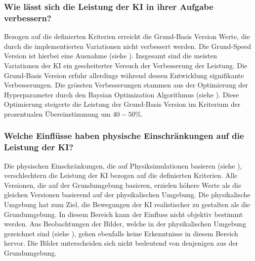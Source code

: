  
\subsubsection*{Wie lässt sich die Leistung der KI in ihrer Aufgabe verbessern?}\label{subsub:d_frage_unter_3}
Bezogen auf die definierten Kriterien erreicht die Grund-Basis Version Werte,
die durch die implementierten Variationen nicht verbessert werden. Die
Grund-Speed Version ist hierbei eine Ausnahme (siehe ).
Insgesamt sind die meisten Variationen der KI ein gescheiterter Versuch der
Verbesserung der Leistung. Die Grund-Basis Version erfuhr allerdings während
dessen Entwicklung signifikante Verbesserungen. Die grössten Verbesserungen
stammen aus der Optimierung der Hyperparameter durch den Baysian Optimization
Algorithmus (siehe ). Diese Optimierung steigerte
die Leistung der Grund-Basis Version im Kriterium der prozentualen
Übereinstimmung um $40-50\%$.
 
\subsubsection*{Welche Einflüsse haben physische Einschränkungen auf die
Leistung der KI?}\label{subsub:d_frage_unter_4} Die physischen Einschränkungen,
die auf Physiksimulationen basieren (siehe ),
verschlechtern die Leistung der KI bezogen auf die definierten Kriterien. Alle
Versionen, die auf der Grundumgebung basieren, erzielen höhere Werte als die
gleichen Versionen basierend auf der physikalischen Umgebung. Die physikalische
Umgebung hat zum Ziel, die Bewegungen der KI realistischer zu gestalten als die
Grundumgebung. In diesem Bereich kann der Einfluss nicht objektiv bestimmt
werden. Aus Beobachtungen der Bilder, welche in der physikalischen Umgebung
gezeichnet sind (siehe ), gehen ebenfalls keine
Erkenntnisse in diesem Bereich hervor. Die Bilder unterscheiden sich nicht
bedeutend von denjenigen aus der Grundumgebung.
 
